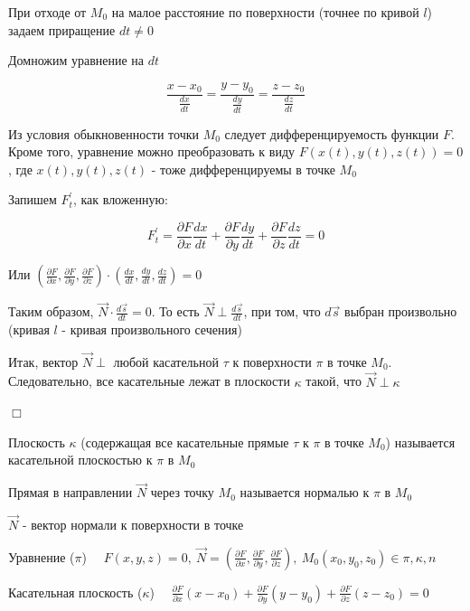 \documentclass[12pt]{article}
\begin{document}
    При отходе от $M_0$ на малое расстояние по поверхности (точнее по кривой $l$) задаем приращение $dt \neq 0$

    Домножим уравнение на $dt$

    \[\frac{x - x_0}{\frac{dx}{dt}} = \frac{y - y_0}{\frac{dy}{dt}} = \frac{z - z_0}{\frac{dz}{dt}}\]

    Из условия обыкновенности точки $M_0$ следует дифференцируемость функции $F$.
    Кроме того, уравнение можно преобразовать к виду $F(x(t), y(t), z(t)) = 0$, где $x(t), y(t), z(t)$ - тоже дифференцируемы в точке $M_0$

    Запишем $F^\prime_t$, как вложенную:

    \[F^\prime_t = \frac{\partial F}{\partial x}\frac{dx}{dt} + \frac{\partial F}{\partial y}\frac{dy}{dt} + \frac{\partial F}{\partial z}\frac{dz}{dt} = 0\]

    Или $\left(\frac{\partial F}{\partial x}, \frac{\partial F}{\partial y}, \frac{\partial F}{\partial z}\right) \cdot \left(\frac{dx}{dt}, \frac{dy}{dt}, \frac{dz}{dt}\right) = 0$

    Таким образом, $\overrightarrow{N} \cdot \frac{d\overrightarrow{s}}{dt} = 0$. То есть $\overrightarrow{N} \perp \frac{d\overrightarrow{s}}{dt}$, при том, что $d\overrightarrow{s}$ выбран произвольно (кривая $l$ - кривая произвольного сечения)

    Итак, вектор $\overrightarrow{N} \perp$ любой касательной $\tau$ к поверхности $\pi$ в точке $M_0$.
    Следовательно, все касательные лежат в плоскости $\kappa$ такой, что $\overrightarrow{N} \perp \kappa$

    $\Box$

    \Def Плоскость $\kappa$ (содержащая все касательные прямые $\tau$ к $\pi$ в точке $M_0$) называется касательной плоскостью к $\pi$ в $M_0$

    \Def Прямая в направлении $\overrightarrow{N}$ через точку $M_0$ называется нормалью к $\pi$ в $M_0$

    $\overrightarrow{N}$ - вектор нормали к поверхности в точке

    Уравнение ($\pi$) $\quad F(x, y, z) = 0, \ \overrightarrow{N} = \left(\frac{\partial F}{\partial x}, \frac{\partial F}{\partial y}, \frac{\partial F}{\partial z}\right), \ M_0(x_0, y_0, z_0) \in \pi, \kappa, n$

    Касательная плоскость ($\kappa$) $\quad \frac{\partial F}{\partial x} (x - x_0) + \frac{\partial F}{\partial y} (y - y_0) + \frac{\partial F}{\partial z} (z - z_0) = 0$
\end{document}
